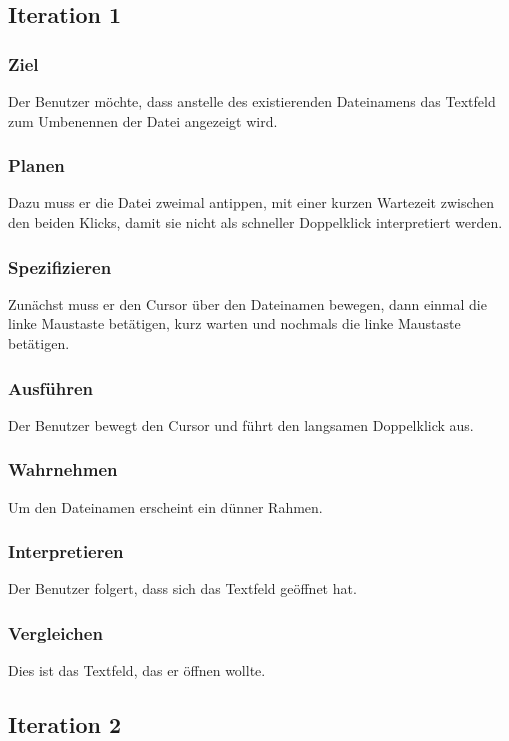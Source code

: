 \subsection*{Iteration 1}
\subsubsection*{Ziel}
Der Benutzer möchte, dass anstelle des existierenden Dateinamens das Textfeld zum Umbenennen der Datei angezeigt wird.
\subsubsection*{Planen}
Dazu muss er die Datei zweimal antippen, mit einer kurzen Wartezeit zwischen den beiden Klicks, damit sie nicht als schneller Doppelklick interpretiert werden.
\subsubsection*{Spezifizieren}
Zunächst muss er den Cursor über den Dateinamen bewegen, dann einmal die linke Maustaste betätigen, kurz warten und nochmals die linke Maustaste betätigen.
\subsubsection*{Ausführen}
Der Benutzer bewegt den Cursor und führt den langsamen Doppelklick aus.
\subsubsection*{Wahrnehmen}
Um den Dateinamen erscheint ein dünner Rahmen.
\subsubsection*{Interpretieren}
Der Benutzer folgert, dass sich das Textfeld geöffnet hat.
\subsubsection*{Vergleichen}
Dies ist das Textfeld, das er öffnen wollte.

\subsection*{Iteration 2}
